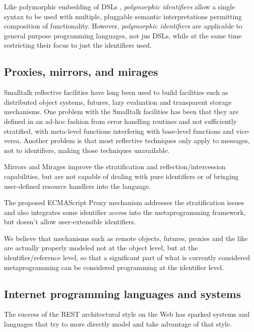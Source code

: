 \documentclass[preprint,authoryear]{acm_proc_article-sp}
\begin{document}
Like polymorphic embedding of DSLs \cite{polydsl}, \emph{polymorphic identifiers} allow
a single syntax to be used with multiple, pluggable semantic interpretations permitting
composition of functionality\cite{embeddeddsl}.  However, \emph{polymorphic identifiers}
are applicable to general purpose programming languages, not jus DSLs, while
at the same time restricting their focus to just the identifiers used.

\subsection{Proxies, mirrors, and mirages}

Smalltalk reflective facilities \cite{reflective-st} have long been used to build
facilities such as distributed object systems, futures, lazy evaluation and
transparent storage mechanisms.  One problem with the Smalltalk facilities
has been that they are defined in an ad-hoc fashion from error handling routines
and not sufficiently stratified, with meta-level functions
interfering with base-level functions and vice-versa.  Another problem is that
most reflective techniques only apply to messages, not to identifiers, making 
those techniques unavailable.

Mirrors \cite{mirrors} and Mirages \cite{mirages} improve the stratification and
reflection/intercession capabilities, but are not capable of dealing with pure
identifiers or of bringing user-defined resource handlers into the language.

The proposed ECMAScript Proxy mechanism \cite{VanCutsemMiller} addresses
the stratification issues and also integrates some identifier access into the 
metaprogramming framework, but doesn't allow user-extensible identifiers.

We believe that mechanisms such as remote objects, futures, proxies and the like
are actually properly modeled not at the object level, but at the identifier/reference
level, so that a significant part of what is currently considered metaprogramming
can be considered programming at the identifier level.

\subsection{Internet programming languages and systems}

The success of the REST architectural style\cite{fielding-rest} on the Web has sparked
systems and languages that try to more directly model and take advantage of that
style.
\end{document}
